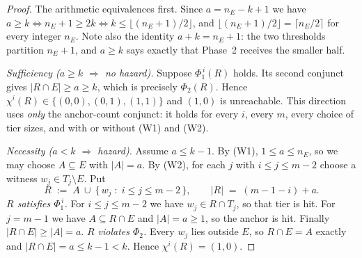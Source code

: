 \begin{proof}
The arithmetic equivalences first.  Since $a=n_E-k+1$ we have
$a\ge k\iff n_E+1\ge 2k\iff k\le\lfloor (n_E+1)/2\rfloor$, and
$\lfloor (n_E+1)/2\rfloor=\lceil n_E/2\rceil$ for every integer $n_E$.
Note also the identity $a+k=n_E+1$: the two thresholds partition
$n_E+1$, and $a\ge k$ says exactly that Phase~2 receives the smaller half.

\smallskip
\emph{Sufficiency ($a\ge k$ $\Rightarrow$ no hazard).}
Suppose $\Phi_1^{\,i}(R)$ holds.  Its second conjunct gives
$|R\cap E|\ge a\ge k$, which is precisely $\Phi_2(R)$.  Hence
$\chi^i(R)\in\{(0,0),(0,1),(1,1)\}$ and $(1,0)$ is unreachable.  This
direction uses \emph{only} the anchor-count conjunct: it holds for every $i$,
every $m$, every choice of tier sizes, and with or without (W1) and (W2).

\smallskip
\emph{Necessity ($a<k$ $\Rightarrow$ hazard).}
Assume $a\le k-1$.  By (W1), $1\le a\le n_E$, so we may choose $A\subseteq E$
with $|A|=a$.  By (W2), for each $j$ with $i\le j\le m-2$ choose a witness
$w_j\in T_j\setminus E$.  Put
\[
  R \;:=\; A\ \cup\ \{\,w_j \;:\; i\le j\le m-2\,\}, \qquad
  |R| \;=\; (m-1-i)+a .
\]
\emph{$R$ satisfies $\Phi_1^{\,i}$.}  For $i\le j\le m-2$ we have
$w_j\in R\cap T_j$, so that tier is hit.  For $j=m-1$ we have
$A\subseteq R\cap E$ and $|A|=a\ge1$, so the anchor is hit.  Finally
$|R\cap E|\ge|A|=a$.
\emph{$R$ violates $\Phi_2$.}  Every $w_j$ lies outside $E$, so
$R\cap E=A$ exactly and $|R\cap E|=a\le k-1<k$.
Hence $\chi^i(R)=(1,0)$.
\end{proof}


